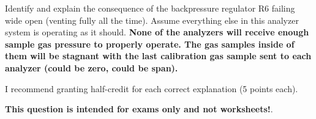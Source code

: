 \vskip 10pt

Identify and explain the consequence of the backpressure regulator R6 failing wide open (venting fully all the time).  Assume everything else in this analyzer system is operating as it should.  {\bf None of the analyzers will receive enough sample gas pressure to properly operate.  The gas samples inside of them will be stagnant with the last calibration gas sample sent to each analyzer (could be zero, could be span).}

\vskip 10pt

I recommend granting half-credit for each correct explanation (5 points each).







{\bf This question is intended for exams only and not worksheets!}.


